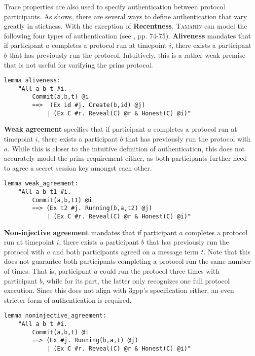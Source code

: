 Trace properties are also used to specify authentication between protocol participants.
As \cite{lowe1997hierarchy} shows, there are several ways to define authentication that vary greatly in stictness.
With the exception of \textbf{Recentness}, \textsc{Tamarin} can model the following four types of authentication (see \cite{tamarin2019manual}, pp. 74-75).
\textbf{Aliveness} mandates that if participant $a$ completes a protocol run at timepoint $i$, there exists a participant $b$ that has previously run the protocol.
Intuitively, this is a rather weak premise that is not useful for varifying the \gls{prins} protocol.

\begin{lstlisting}
lemma aliveness:
    "All a b t #i.
        Commit(a,b,t) @i
        ==>  (Ex id #j. Create(b,id) @j)
            | (Ex C #r. Reveal(C) @r & Honest(C) @i)"
\end{lstlisting}

\textbf{Weak agreement} specifies that if participant $a$ completes a protocol run at timepoint $i$, there exists a participant $b$ that has previously run the protocol with $a$.
While this is closer to the intuitive definition of authentication, this does not accurately model the \gls{prins} requirement either, as both participants further need to agree a secret session key amongst each other.

\begin{lstlisting}
lemma weak_agreement:
    "All a b t1 #i. 
        Commit(a,b,t1) @i
        ==> (Ex t2 #j. Running(b,a,t2) @j)
            | (Ex C #r. Reveal(C) @r & Honest(C) @i)"
\end{lstlisting}

\textbf{Non-injective agreement} mandates that if participant $a$ completes a protocol run at timepoint $i$, there exists a participant $b$ that has previously run the protocol with $a$ and both participants agreed on a message term $t$.
Note that this does not guarantee both participants completing a protocol run the same number of times.
That is, participant $a$ could run the protocol three times with participant $b$, while for its part, the latter only recognizes one full protocol execution.
Since this does not align with \gls{3gpp}'s specification either, an even stricter form of authentication is required.

\begin{lstlisting}
lemma noninjective_agreement:
    "All a b t #i. 
        Commit(a,b,t) @i
        ==> (Ex #j. Running(b,a,t) @j)
            | (Ex C #r. Reveal(C) @r & Honest(C) @i)"
\end{lstlisting}

